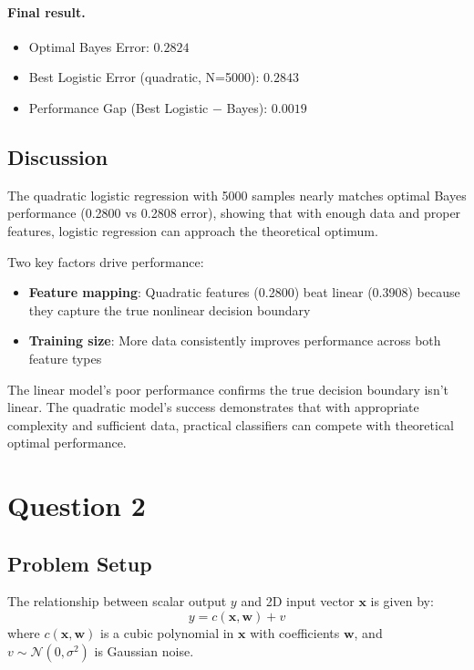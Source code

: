 \documentclass[12pt]{article}
\begin{document}
\paragraph{Final result.}
\begin{itemize}
  \item Optimal Bayes Error: \(\mathbf{0.2824}\)
  \item Best Logistic Error (quadratic, N=5000): \(\mathbf{0.2843}\)
  \item Performance Gap (Best Logistic − Bayes): \(\mathbf{0.0019}\)
\end{itemize}

\subsection{Discussion}

The quadratic logistic regression with 5000 samples nearly matches optimal Bayes performance (0.2800 vs 0.2808 error), showing that with enough data and proper features, logistic regression can approach the theoretical optimum.

Two key factors drive performance:
\begin{itemize}
    \item \textbf{Feature mapping}: Quadratic features (0.2800) beat linear (0.3908) because they capture the true nonlinear decision boundary
    \item \textbf{Training size}: More data consistently improves performance across both feature types
\end{itemize}

The linear model's poor performance confirms the true decision boundary isn't linear. The quadratic model's success demonstrates that with appropriate complexity and sufficient data, practical classifiers can compete with theoretical optimal performance.


\newpage
\section{Question 2}

\subsection{Problem Setup}
The relationship between scalar output $y$ and 2D input vector $\mathbf{x}$ is given by:
\[
y = c(\mathbf{x},\mathbf{w}) + v
\]
where $c(\mathbf{x},\mathbf{w})$ is a cubic polynomial in $\mathbf{x}$ with coefficients $\mathbf{w}$, and $v \sim \mathcal{N}(0, \sigma^2)$ is Gaussian noise.
\end{document}

